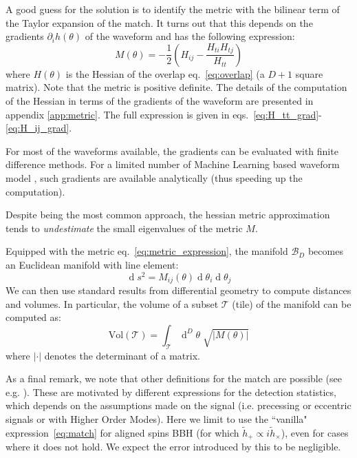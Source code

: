 \documentclass[twocolumn,showpacs,preprintnumbers,nofootinbib,prd,
superscriptaddress,10pt]{revtex4-1}
\renewcommand{\d}[1]{\ensuremath{\operatorname{d}\!{#1}}}
\renewcommand{\dvol}[2]{\ensuremath{\operatorname{d}^{#2}\!{#1}}}
\begin{document}
A good guess for the solution is to identify the metric with the bilinear term of the Taylor expansion of the match.
It turns out that this depends on the gradients $\partial_i h(\theta)$ of the waveform and has the following expression:
\begin{equation}\label{eq:metric_expression}
	M(\theta) = - \frac{1}{2} \left( H_{ij} - \frac{H_{ti}H_{tj}}{H_{tt}} \right)
\end{equation}
where $H(\theta)$ is the Hessian of the overlap eq.~\eqref{eq:overlap} (a $D+1$ square matrix). Note that the metric is positive definite.
The details of the computation of the Hessian in terms of the gradients of the waveform are presented in appendix \ref{app:metric}.
The full expression is given in eqs.~\eqref{eq:H_tt_grad}-\eqref{eq:H_ij_grad}.

For most of the waveforms available, the gradients can be evaluated with finite difference methods. For a limited number of Machine Learning based waveform model \cite{something}, such gradients are available analytically (thus speeding up the computation).

Despite being the most common approach, the hessian metric approximation tends to {\it undestimate} the small eigenvalues of the metric $M$. 

Equipped with the metric eq.~\eqref{eq:metric_expression}, the manifold $\mathcal{B}_D$ becomes an Euclidean manifold with line element:
\begin{equation}\label{eq:line_element}
	\d{s^2} = M_{ij}(\theta) \d{\theta_i} \d{\theta_j}
\end{equation}
We can then use standard results from differential geometry to compute distances and volumes. In particular, the volume of a subset $\mathcal{T}$ (tile) of the manifold can be computed as:
\begin{equation}\label{eq:volume_tile}
	\text{Vol}(\mathcal{T}) = \int_\mathcal{T} \dvol{\theta}{D} \; \sqrt{|M(\theta)|}
\end{equation}
where $|\cdot|$ denotes the determinant of a matrix.

As a final remark, we note that other definitions for the match are possible (see e.g. \cite{sky_maxed,symphony}). These are motivated by different expressions for the detection statistics, which depends on the assumptions made on the signal (i.e. precessing or eccentric signals or with Higher Order Modes). Here we limit to use the ``vanilla" expression~\eqref{eq:match} for aligned spins BBH (for which $\tilde{h}_+ \propto i \tilde{h}_\times$), even for cases where it does not hold. We expect the error introduced by this to be negligible.
\end{document}

